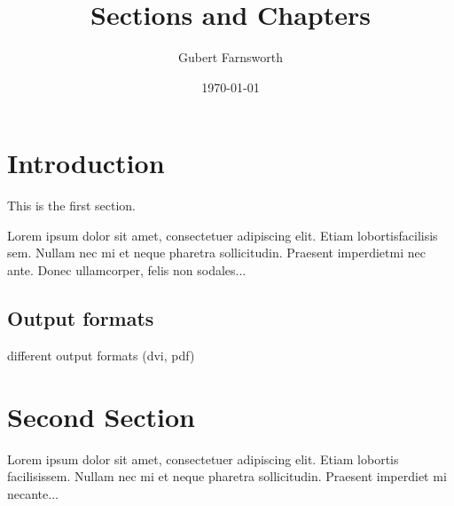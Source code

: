 \documentclass{article}
\title{Sections and Chapters}
\author{Gubert Farnsworth}
\date{\today}
\begin{document}
 
\maketitle
 
\section{Introduction}
 
This is the first section.
 
Lorem  ipsum  dolor  sit  amet,  consectetuer  adipiscing  
elit.   Etiam  lobortisfacilisis sem.  Nullam nec mi et 
neque pharetra sollicitudin.  Praesent imperdietmi nec ante. 
Donec ullamcorper, felis non sodales...

\subsection{Output formats}
 
different output formats (dvi, pdf)
 
\section{Second Section}
 
Lorem ipsum dolor sit amet, consectetuer adipiscing elit.  
Etiam lobortis facilisissem.  Nullam nec mi et neque pharetra 
sollicitudin.  Praesent imperdiet mi necante...
 
\end{document}
